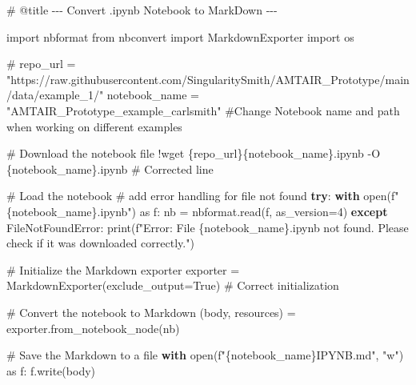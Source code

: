 \documentclass[
  11pt,
  letterpaper,
]{book}
\newenvironment{Shaded}{\begin{snugshade}}{\end{snugshade}}
\newcommand{\BuiltInTok}[1]{\textcolor[rgb]{0.00,0.23,0.31}{#1}}
\newcommand{\CommentTok}[1]{\textcolor[rgb]{0.37,0.37,0.37}{#1}}
\newcommand{\ControlFlowTok}[1]{\textcolor[rgb]{0.00,0.23,0.31}{\textbf{#1}}}
\newcommand{\DecValTok}[1]{\textcolor[rgb]{0.68,0.00,0.00}{#1}}
\newcommand{\ImportTok}[1]{\textcolor[rgb]{0.00,0.46,0.62}{#1}}
\newcommand{\NormalTok}[1]{\textcolor[rgb]{0.00,0.23,0.31}{#1}}
\newcommand{\OperatorTok}[1]{\textcolor[rgb]{0.37,0.37,0.37}{#1}}
\newcommand{\PreprocessorTok}[1]{\textcolor[rgb]{0.68,0.00,0.00}{#1}}
\newcommand{\SpecialCharTok}[1]{\textcolor[rgb]{0.37,0.37,0.37}{#1}}
\newcommand{\SpecialStringTok}[1]{\textcolor[rgb]{0.13,0.47,0.30}{#1}}
\newcommand{\StringTok}[1]{\textcolor[rgb]{0.13,0.47,0.30}{#1}}
\newcommand{\VariableTok}[1]{\textcolor[rgb]{0.07,0.07,0.07}{#1}}
\begin{document}
\begin{Shaded}
\begin{Highlighting}[]
\CommentTok{\# @title {-}{-}{-} Convert .ipynb Notebook to MarkDown {-}{-}{-}}

\ImportTok{import}\NormalTok{ nbformat}
\ImportTok{from}\NormalTok{ nbconvert }\ImportTok{import}\NormalTok{ MarkdownExporter}
\ImportTok{import}\NormalTok{ os}

\CommentTok{\# repo\_url = "https://raw.githubusercontent.com/SingularitySmith/AMTAIR\_Prototype/main/data/example\_1/"}
\NormalTok{notebook\_name }\OperatorTok{=} \StringTok{"AMTAIR\_Prototype\_example\_carlsmith"}  \CommentTok{\#Change Notebook name and path when working on different examples}

\CommentTok{\# Download the notebook file}
\OperatorTok{!}\NormalTok{wget \{repo\_url\}\{notebook\_name\}.ipynb }\OperatorTok{{-}}\NormalTok{O \{notebook\_name\}.ipynb  }\CommentTok{\# Corrected line}

\CommentTok{\# Load the notebook}
\CommentTok{\# add error handling for file not found}
\ControlFlowTok{try}\NormalTok{:}
  \ControlFlowTok{with} \BuiltInTok{open}\NormalTok{(}\SpecialStringTok{f"}\SpecialCharTok{\{}\NormalTok{notebook\_name}\SpecialCharTok{\}}\SpecialStringTok{.ipynb"}\NormalTok{) }\ImportTok{as}\NormalTok{ f:}
\NormalTok{    nb }\OperatorTok{=}\NormalTok{ nbformat.read(f, as\_version}\OperatorTok{=}\DecValTok{4}\NormalTok{)}
\ControlFlowTok{except} \PreprocessorTok{FileNotFoundError}\NormalTok{:}
  \BuiltInTok{print}\NormalTok{(}\SpecialStringTok{f"Error: File \textquotesingle{}}\SpecialCharTok{\{}\NormalTok{notebook\_name}\SpecialCharTok{\}}\SpecialStringTok{.ipynb\textquotesingle{} not found. Please check if it was downloaded correctly."}\NormalTok{)}


\CommentTok{\# Initialize the Markdown exporter}
\NormalTok{exporter }\OperatorTok{=}\NormalTok{ MarkdownExporter(exclude\_output}\OperatorTok{=}\VariableTok{True}\NormalTok{)  }\CommentTok{\# Correct initialization}

\CommentTok{\# Convert the notebook to Markdown}
\NormalTok{(body, resources) }\OperatorTok{=}\NormalTok{ exporter.from\_notebook\_node(nb)}

\CommentTok{\# Save the Markdown to a file}
\ControlFlowTok{with} \BuiltInTok{open}\NormalTok{(}\SpecialStringTok{f"}\SpecialCharTok{\{}\NormalTok{notebook\_name}\SpecialCharTok{\}}\SpecialStringTok{IPYNB.md"}\NormalTok{, }\StringTok{"w"}\NormalTok{) }\ImportTok{as}\NormalTok{ f:}
\NormalTok{    f.write(body)}
\end{Highlighting}
\end{Shaded}
\end{document}
